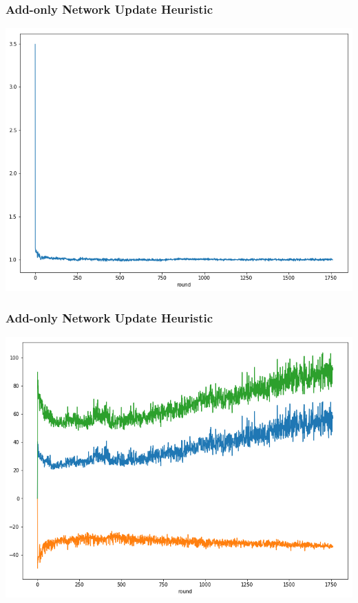 \documentclass{beamer}
\begin{document}
\begin{frame}
  \frametitle{Add-only Network Update Heuristic}
  \includegraphics[width=\textwidth]{h1allpriceave.png}
\end{frame}

\begin{frame}
  \frametitle{Add-only Network Update Heuristic}
  \includegraphics[width=\textwidth]{h1allgap.png}
\end{frame}
\end{document}
